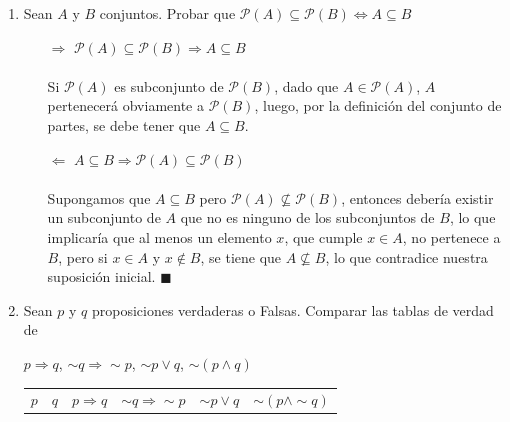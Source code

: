\documentclass[a4paper,10pt]{article}
\newcommand{\partesde}[1][*]{
    \mathcal{P}({#1})
}
\begin{document}
\begin{enumerate}
\begin{enumerate}[label = \roman*)]
\begin{minipage}[c]{0.8\linewidth}
            \end{minipage}
        \end{enumerate}
        \item Sean $A$ y $B$ conjuntos. Probar que $\mathcal{P}(A)\subseteq \mathcal{P}(B)\Leftrightarrow A \subseteq B$
        \begin{itemize}
            \item[$\Rightarrow$] $\mathcal{P}(A)\subseteq \mathcal{P}(B)\Rightarrow A \subseteq B$\\\\
            Si $\partesde[A]$ es subconjunto de $\partesde[B]$, dado que $A\in\partesde[A]$, $A$ pertenecer\'a obviamente a $\partesde[B]$, luego, por la definici\'on del conjunto de partes, se debe tener que $A\subseteq B$.\\
            \item[$\Leftarrow$] $A \subseteq B \Rightarrow \mathcal{P}(A)\subseteq \mathcal{P}(B) $\\\\
            Supongamos que  $A\subseteq B$ pero $\partesde[A] \not\subseteq \partesde[B]$, entonces deber\'ia existir un subconjunto de $A$ que no es ninguno de los subconjuntos de $B$, lo que implicar\'ia que al menos un elemento $x$, que cumple $x\in A$, no pertenece a $B$, pero si $x\in A$ y $x\not\in B$, se tiene que $A\not\subseteq B$, lo que contradice nuestra suposici\'on inicial. $\blacksquare$
        \end{itemize}
        \item Sean $p$ y $q$ proposiciones verdaderas o Falsas. Comparar las tablas de verdad de
        \begin{center}
            $p\Rightarrow q$, \hspace*{12pt} $\sim q \Rightarrow \sim p $, \hspace*{12pt} $\sim p \vee q$, \hspace*{12pt} $\sim(p\wedge q)$\\\vspace{12pt}
            \begin{table}[!h]
                \captionsetup{width=.6\textwidth}
                \centering
                    \begin{tabular}{cc|c|c|c|c|c|c|c|c|c}\hline
                        \cellcolor{g} $p$ & \cellcolor{g} $q$   & \cellcolor{g}$p\Rightarrow q$ & \multicolumn{3}{c|}{ \cellcolor{g} $\sim q \Rightarrow \sim p $}  & \multicolumn{2}{c|}{ \cellcolor{g}$\sim p \vee q $}   & \multicolumn{3}{c}{ \cellcolor{g}$\sim(p\wedge \sim q)$} \\

\end{tabular}
\end{table}
\end{center}
\end{enumerate}
\end{document}
